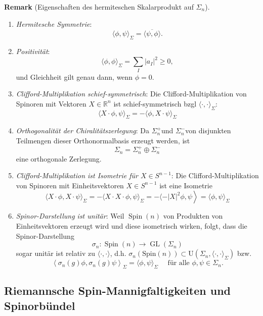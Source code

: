 \documentclass[10pt, letterpaper]{article}
\newcommand{\R}{\mathbb{R}}
\newcommand{\Spin}{\mathrm{Spin}}
\newcommand{\U}{\mathrm{U}}
\newcommand{\CustomHeading}[3]{%
  \par\medskip\noindent%
  \textbf{#1 #2} \textnormal{(#3)}.\enskip%
}
\newenvironment{REM}[2]{\CustomHeading{Remark}{#1}{#2}}{}
\begin{document}
\begin{REM}{}{Eigenschaften des hermiteschen Skalarprodukt auf $\Sigma_n$}
  \begin{enumerate}
    \item \emph{Hermitesche Symmetrie}:
    $$
    \langle\phi, \psi\rangle_\Sigma=\overline{\langle\psi, \phi\rangle} .
    $$
    \item \emph{Positivität}:
    $$
    \langle\phi, \phi\rangle_\Sigma=\sum_I\left|a_I\right|^2 \geq 0,
    $$
    und Gleichheit gilt genau dann, wenn $\phi=0$.
    \item \emph{Clifford-Multiplikation schief-symmetrisch}: Die Clifford-Multiplikation von Spinoren mit Vektoren $X\in\R^n$ ist schief-symmetrisch bzgl $\langle\cdot,\cdot\rangle_\Sigma$:
    $$\langle X \cdot \phi, \psi\rangle_\Sigma= -\langle\phi, X \cdot  \psi\rangle_\Sigma$$
    \item \emph{Orthogonalität der Chiralitätszerlegung}: Da $\Sigma_n^{+}$und $\Sigma_n^{-}$von disjunkten Teilmengen dieser Orthonormalbasis erzeugt werden, ist
    $$
    \Sigma_n=\Sigma_n^{+} \oplus \Sigma_n^{-}
    $$
    eine orthogonale Zerlegung.
    \item \emph{Clifford-Multiplikation ist Isometrie für $X\in S^{n-1}$}: Die Clifford-Multiplikation von Spinoren mit Einheitsvektoren $X\in S^{n-1}$ ist eine Isometrie
    $$\left.\langle X \cdot \phi, X \cdot \psi\rangle_\Sigma=-\langle X \cdot X \cdot \phi, \psi\rangle_\Sigma=-\langle-| X|^2 \phi, \psi\right\rangle=\langle\phi, \psi\rangle_\Sigma$$
    \item \emph{Spinor-Darstellung ist unitär}: Weil $\operatorname{Spin}(n)$ von Produkten von Einheitsvektoren erzeugt wird und diese isometrisch wirken, folgt, dass die Spinor-Darstellung
    $$
    \sigma_n: \operatorname{Spin}(n) \rightarrow \operatorname{GL}\left(\Sigma_n\right)
    $$
    sogar unitär ist relativ zu $\langle\cdot, \cdot\rangle$, d.h. $\sigma_n(\Spin(n))\subset \U(\Sigma_n,\langle\cdot,\cdot\rangle_\Sigma)$ bzw.
    $$\left\langle\sigma_n(g) \phi, \sigma_n(g) \psi\right\rangle_{\Sigma}=\langle\phi, \psi\rangle_{\Sigma} \quad \text{ für alle } \phi, \psi \in \Sigma_n.$$
  \end{enumerate}
  
\end{REM}

\pagebreak



\subsection{Riemannsche Spin-Mannigfaltigkeiten und Spinorbündel}
\end{document}
